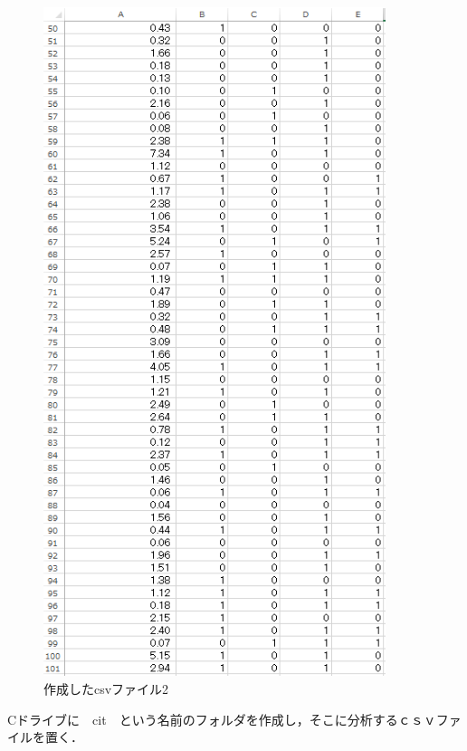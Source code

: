 \begin{figure}[H]
\centering
\includegraphics[width=10cm]{keka2.PNG}
\caption{作成したcsvファイル2}\label{サンプル図}
\end{figure}





Cドライブに　cit　という名前のフォルダを作成し，そこに分析するｃｓｖファイルを置く．


